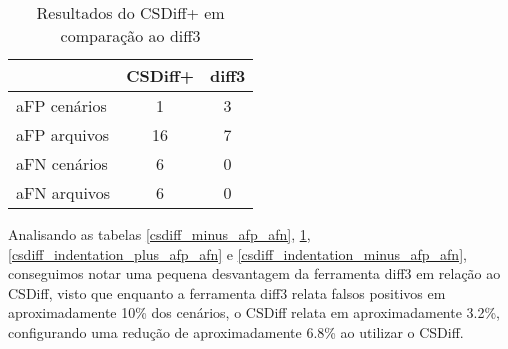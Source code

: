 \begin{table}[ht]
	\begin{center}
		\begin{tabular}{|l|c|c|}
			\hline
			\textbf{ }   & \textbf{CSDiff+} & \textbf{diff3} \\
			\hline
			aFP cenários & 1                & 3              \\
			aFP arquivos & 16               & 7              \\
			aFN cenários & 6                & 0              \\
			aFN arquivos & 6                & 0              \\
			\hline
		\end{tabular}
	\end{center}
	\caption{Resultados do CSDiff+ em comparação ao diff3}\label{csdiff_plus_afp_afn}
\end{table}
Analisando as tabelas \ref{csdiff_minus_afp_afn}, \ref{csdiff_plus_afp_afn}, \ref{csdiff_indentation_plus_afp_afn} e
\ref{csdiff_indentation_minus_afp_afn}, conseguimos notar uma pequena desvantagem da ferramenta diff3 em relação ao CSDiff,
visto que enquanto a ferramenta diff3 relata falsos positivos em aproximadamente 10\% dos cenários, o
CSDiff relata em aproximadamente 3.2\%, configurando uma redução de aproximadamente 6.8\% ao utilizar o CSDiff.

